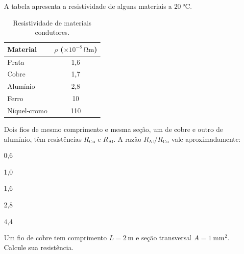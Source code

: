 \begin{questao}[2]{}
A tabela apresenta a resistividade de alguns materiais a $\SI{20}{\celsius}$.

\begin{table}[H]
\centering\small\sffamily
\begin{tabular}{@{}l c@{}}
\toprule
\textbf{Material} & \textbf{$\rho$ ($\times10^{-8}\,\si{\ohm\meter}$)}\\
\midrule
Prata      & 1,6\\
Cobre      & 1,7\\
Alumínio   & 2,8\\
Ferro      & 10\\
Níquel-cromo & 110\\
\bottomrule
\end{tabular}
\caption{Resistividade de materiais condutores.}
\end{table}

Dois fios de mesmo comprimento e mesma seção, um de cobre e outro de alumínio,
têm resistências $R_{\text{Cu}}$ e $R_{\text{Al}}$. A razão
$R_{\text{Al}}/R_{\text{Cu}}$ vale aproximadamente:
\begin{alternativas}[3]
\item 0,6
\item 1,0
\item 1,6
\item 2,8
\item 4,4
\end{alternativas}
\end{questao}

\begin{questao}[2]{}
Um fio de cobre tem comprimento $L = \SI{2}{\meter}$ e seção transversal
$A = \SI{1}{\milli\meter\squared}$. Calcule sua resistência.
\end{questao}

